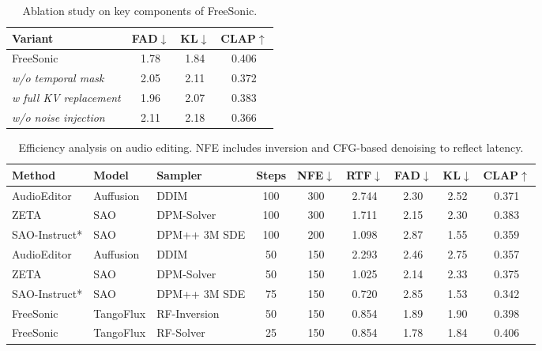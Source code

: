 \begin{table}[t]
\centering
\scriptsize
\caption{Ablation study on key components of FreeSonic.}
\begin{tabular}{l|ccc}
\toprule
Variant & FAD$\downarrow$ & KL$\downarrow$ & CLAP$\uparrow$ \\
\midrule
FreeSonic                               & 1.78 & 1.84 & 0.406 \\
\quad \textit{w/o temporal mask}        & 2.05 & 2.11 & 0.372 \\
\quad \textit{w full KV replacement}    & 1.96 & 2.07 & 0.383 \\
\quad \textit{w/o noise injection}      & 2.11 & 2.18 & 0.366 \\
\bottomrule
\end{tabular}
\label{tab:ablation}
\vspace{-0.5em}
\end{table}

\begin{table}[t]
\centering
\tiny
\caption{Efficiency analysis on audio editing. NFE includes inversion and CFG-based denoising to reflect latency.}
\setlength{\tabcolsep}{4pt}
\begin{tabular}{@{}l l l|cccccc@{}}
\toprule
Method & Model & Sampler & Steps & NFE$\downarrow$ & RTF$\downarrow$ & FAD$\downarrow$ & KL$\downarrow$ & CLAP$\uparrow$ \\
\midrule
AudioEditor  & Auffusion         & DDIM         & 100 & 300 & 2.744 & 2.30 & 2.52 & 0.371 \\
ZETA         & SAO               & DPM-Solver   & 100 & 300 & 1.711 & 2.15 & 2.30 & 0.383 \\
SAO-Instruct*& SAO               & DPM++ 3M SDE & 100 & 200 & 1.098 & 2.87 & 1.55 & 0.359 \\
\midrule
AudioEditor  & Auffusion         & DDIM         & 50  & 150  & 2.293 & 2.46 & 2.75 & 0.357 \\
ZETA         & SAO               & DPM-Solver   & 50  & 150  & 1.025 & 2.14 & 2.33 & 0.375 \\
SAO-Instruct*& SAO               & DPM++ 3M SDE & 75  & 150  & 0.720 & 2.85 & 1.53 & 0.342 \\
\midrule
FreeSonic    & TangoFlux         & RF-Inversion & 50  & 150 & 0.854 & 1.89 & 1.90 & 0.398 \\
FreeSonic    & TangoFlux         & RF-Solver    & 25  & 150 & 0.854 & 1.78 & 1.84 & 0.406 \\
\bottomrule
\end{tabular}
\label{tab:efficiency}
\vspace{-2em}
\end{table}

